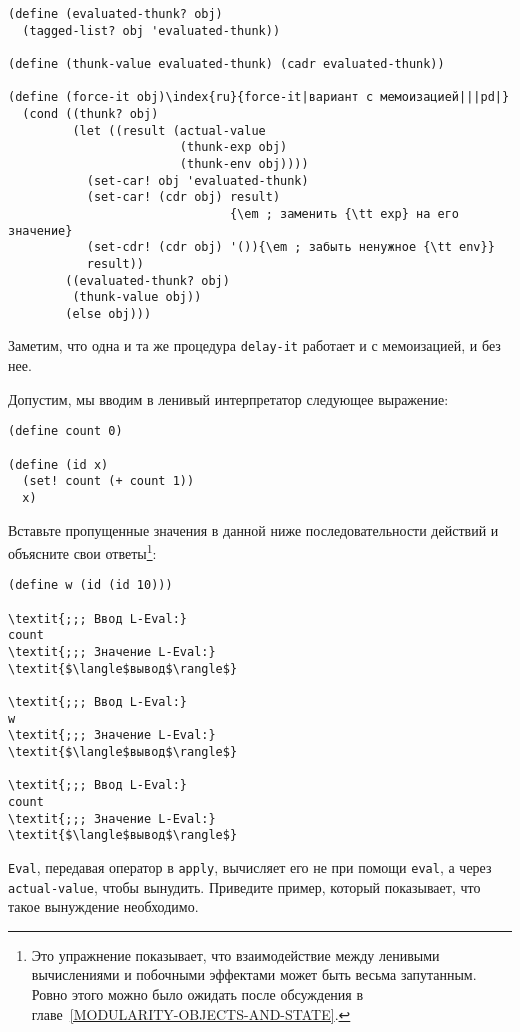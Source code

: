 \begin{Verbatim}[fontsize=\small]
(define (evaluated-thunk? obj)
  (tagged-list? obj 'evaluated-thunk))

(define (thunk-value evaluated-thunk) (cadr evaluated-thunk))

(define (force-it obj)\index{ru}{force-it|вариант с мемоизацией|||pd|}
  (cond ((thunk? obj)
         (let ((result (actual-value
                        (thunk-exp obj)
                        (thunk-env obj))))
           (set-car! obj 'evaluated-thunk)
           (set-car! (cdr obj) result) 
	                           {\em ; заменить {\tt exp} на его значение}
           (set-cdr! (cdr obj) '()){\em ; забыть ненужное {\tt env}}
           result))
        ((evaluated-thunk? obj)
         (thunk-value obj))
        (else obj)))
\end{Verbatim}
Заметим, что одна и та же процедура {\tt delay-it} работает и с
мемоизацией, и без нее.
\begin{exercise}{4.27}%
\label{EX4.27}%
Допустим, мы вводим в ленивый интерпретатор следующее
выражение:

\begin{Verbatim}[fontsize=\small]
(define count 0)

(define (id x)
  (set! count (+ count 1))
  x)
\end{Verbatim}
Вставьте пропущенные значения в данной ниже последовательности
действий и объясните свои ответы\footnote{Это упражнение показывает, что 
взаимодействие между
ленивыми вычислениями и побочными эффектами может быть весьма
запутанным.  Ровно этого можно было ожидать после обсуждения в
главе~\ref{MODULARITY-OBJECTS-AND-STATE}.}:

\begin{Verbatim}[fontsize=\small]
(define w (id (id 10)))

\textit{;;; Ввод L-Eval:}
count
\textit{;;; Значение L-Eval:}
\textit{$\langle$вывод$\rangle$}

\textit{;;; Ввод L-Eval:}
w
\textit{;;; Значение L-Eval:}
\textit{$\langle$вывод$\rangle$}

\textit{;;; Ввод L-Eval:}
count
\textit{;;; Значение L-Eval:}
\textit{$\langle$вывод$\rangle$}
\end{Verbatim}
\end{exercise}
\begin{exercise}{4.28}%
\label{EX4.28}%
{\tt Eval}, передавая оператор в
{\tt apply}, вычисляет его не при помощи {\tt eval}, а
через {\tt actual-value}, чтобы вынудить.  Приведите пример, который
показывает, что такое вынуждение необходимо.
\end{exercise}

